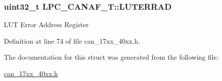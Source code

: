 \subsubsection[{\texorpdfstring{L\+U\+T\+E\+R\+R\+AD}{LUTERRAD}}]{ uint32\+\_\+t L\+P\+C\+\_\+\+C\+A\+N\+A\+F\+\_\+\+T\+::\+L\+U\+T\+E\+R\+R\+AD}\hypertarget{structLPC__CANAF__T_ac98a6bb03e4031fbfee27c49b884fddd}{}\label{structLPC__CANAF__T_ac98a6bb03e4031fbfee27c49b884fddd}
L\+UT Error Address Register 

Definition at line 74 of file can\+\_\+17xx\+\_\+40xx.\+h.



The documentation for this struct was generated from the following file\+:\begin{DoxyCompactItemize}
\item 
\hyperlink{can__17xx__40xx_8h}{can\+\_\+17xx\+\_\+40xx.\+h}\end{DoxyCompactItemize}
